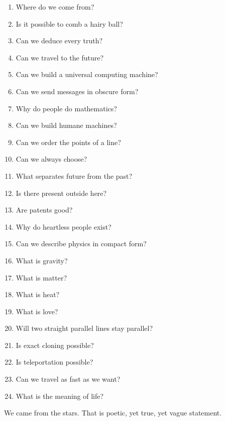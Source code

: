 \documentclass[11pt,oneside,%
]{memoir}
\theoremstyle{definition}
\begin{document}
\begin{enumerate}
    \item Where do we come from?
    \item Is it possible to comb a hairy ball?
    \item Can we deduce every truth?
    \item Can we travel to the future?
    \item Can we build a universal computing machine?
    \item Can we send messages in obscure form?
    \item Why do people do mathematics?
    \item Can we build humane machines?
    \item Can we order the points of a line?
    \item Can we always choose?
    \item What separates future from the past?
    \item Is there present outside here?
    \item Are patents good?
    \item Why do heartless people exist?
    \item Can we describe physics in compact form?
    \item What is gravity?
    \item What is matter?
    \item What is heat?
    \item What is love?
    \item Will two straight parallel lines stay parallel?
    \item Is exact cloning possible?
    \item Is teleportation possible?
    \item Can we travel as fast as we want?
    \item What is the meaning of life?
\end{enumerate}

We came from the stars. That is poetic, yet true, yet vague statement. 
\end{document}
